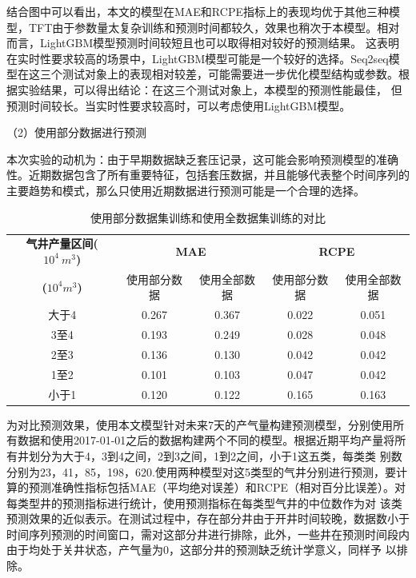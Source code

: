 结合图中可以看出，本文的模型在MAE和RCPE指标上的表现均优于其他三种模型，TFT由于参数量太复杂训练和预测时间都较久，效果也稍次于本模型。相对而言，LightGBM模型预测时间较短且也可以取得相对较好的预测结果。
这表明在实时性要求较高的场景中，LightGBM模型可能是一个较好的选择。Seq2seq模型在这三个测试对象上的表现相对较差，可能需要进一步优化模型结构或参数。根据实验结果，可以得出结论：在这三个测试对象上，本模型的预测性能最佳，
但预测时间较长。当实时性要求较高时，可以考虑使用LightGBM模型。

（2）使用部分数据进行预测

本次实验的动机为：由于早期数据缺乏套压记录，这可能会影响预测模型的准确性。近期数据包含了所有重要特征，包括套压数据，并且能够代表整个时间序列的主要趋势和模式，那么只使用近期数据进行预测可能是一个合理的选择。
\begin{table}[h]
    \renewcommand{\arraystretch}{1.5}
    \centering
    \caption{使用部分数据集训练和使用全数据集训练的对比}
    \label{tab:alldatacomparison}
    \begin{tabular}{|c|c|c|c|c|}
    \hline
    \textbf{气井产量区间($10^4 \ m^3$)} & \multicolumn{2}{c|}{\textbf{MAE}} & \multicolumn{2}{c|}{\textbf{RCPE}} \\ 
    \cline{2-5} 
    \textbf{(}$10^4 m^3$\textbf{)} & 使用部分数据 & 使用全部数据 & 使用部分数据 & 使用全部数据 \\ 
    \hline
    大于4               & 0.267        & 0.367        & 0.022        & 0.051        \\ 
    \hline
    3至4               & 0.193        & 0.249        & 0.028        & 0.048        \\ 
    \hline
    2至3               & 0.136        & 0.130        & 0.042        & 0.042        \\ 
    \hline
    1至2               & 0.101        & 0.103        & 0.047        & 0.042        \\ 
    \hline
    小于1               & 0.120        & 0.122        & 0.165        & 0.163        \\ 
    \hline
    \end{tabular}
\end{table}
为对比预测效果，使用本文模型针对未来7天的产气量构建预测模型，分别使用所有数据和使用2017-01-01之后的数据构建两个不同的模型。根据近期平均产量将所有井划分为大于4，3到4之间，2到3之间，1到2之间，小于1这五类，每类类
别数分别为23，41，85，198，620.使用两种模型对这5类型的气井分别进行预测，要计算的预测准确性指标包括MAE（平均绝对误差）和RCPE（相对百分比误差）。对每类型井的预测指标进行统计，使用预测指标在每类型气井的中位数作为对
该类预测效果的近似表示。在测试过程中，存在部分井由于开井时间较晚，数据数小于时间序列预测的时间窗口，需对这部分井进行排除，此外，一些井在预测时间段内由于均处于关井状态，产气量为0，这部分井的预测缺乏统计学意义，同样予
以排除。
    
